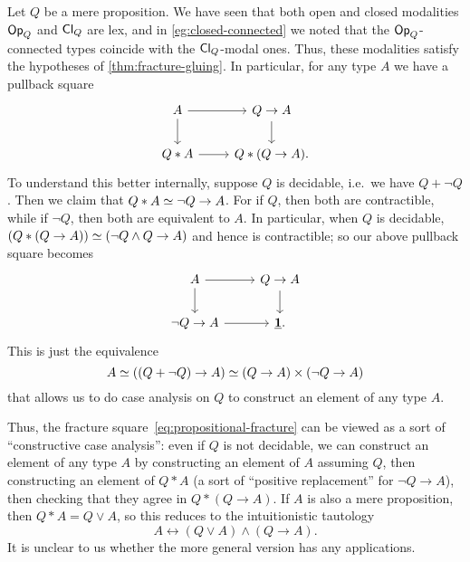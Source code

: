 \begin{eg}\label{eg:artin}
  Let $Q$ be a mere proposition.
  We have seen that both open and closed modalities $\mathsf{Op}_{Q}$ and $\mathsf{Cl}_{Q}$ are lex, and in \cref{eg:closed-connected} we noted that the $\mathsf{Op}_{Q}$-connected types coincide with the $\mathsf{Cl}_{Q}$-modal ones.
  Thus, these modalities satisfy the hypotheses of \cref{thm:fracture-gluing}.
  In particular, for any type $A$ we have a pullback square
  \begin{equation}
  \begin{tikzcd}
    A \ar[r] \ar[d] & Q\to A \ar[d] \\
    Q\ast A \ar[r] & Q\ast(Q\to A).
  \end{tikzcd}\label{eq:propositional-fracture}
  \end{equation}
  To understand this better internally, suppose $Q$ is decidable, i.e.\ we have $Q+\neg Q$.
  Then we claim that $\eqv{Q\ast A}{\neg Q \to A}$.
  For if $Q$, then both are contractible, while if $\neg Q$, then both are equivalent to $A$.
  In particular, when $Q$ is decidable, $\eqv{(Q\ast (Q\to A))}{(\neg Q \land Q \to A)}$ and hence is contractible; so our above pullback square becomes
  \[
  \begin{tikzcd}
    A \ar[r] \ar[d] & Q\to A \ar[d] \\
    \neg Q\to A \ar[r] & \unit.
  \end{tikzcd}
  \]
  This is just the equivalence
  \[A \simeq ((Q+\neg Q) \to A) \simeq (Q\to A) \times (\neg Q \to A) \]
  that allows us to do case analysis on $Q$ to construct an element of any type $A$.

  Thus, the fracture square~\eqref{eq:propositional-fracture} can be viewed as a sort of ``constructive case analysis'': even if $Q$ is not decidable, we can construct an element of any type $A$ by constructing an element of $A$ assuming $Q$, then constructing an element of $Q\ast A$ (a sort of ``positive replacement'' for $\neg Q \to A$), then checking that they agree in $Q\ast (Q\to A)$.
  If $A$ is also a mere proposition, then $Q\ast A = Q\lor A$, so this reduces to the intuitionistic tautology
  \[ A \leftrightarrow (Q\lor A) \land (Q\to A). \]
  It is unclear to us whether the more general version has any applications.
\end{eg}


